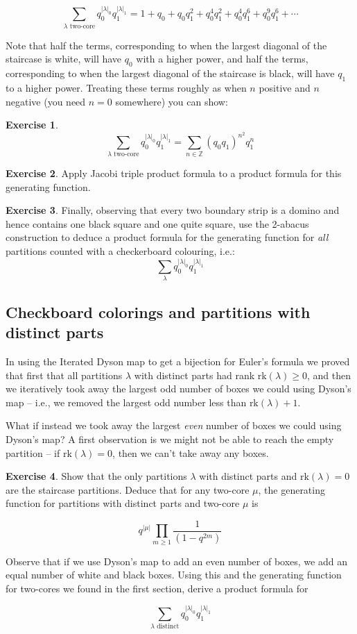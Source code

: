 \documentclass{article}
\theoremstyle{definition}
\newtheorem{exercise}{Exercise}
\begin{document}
$$\sum_{\lambda \textrm{ two-core}}q_0^{|\lambda|_0}q_1^{|\lambda|_1}=1+q_0+q_0q_1^2+q_0^4q_1^2+q_0^4q_1^6+q_0^9q_1^6+\cdots$$

Note that half the terms, corresponding to when the largest diagonal of the staircase is white, will have $q_0$ with a higher power, and half the terms, corresponding to when the largest diagonal of the staircase is black, will have $q_1$ to a higher power. Treating these terms roughly as when $n$ positive and $n$ negative (you need $n=0$ somewhere) you can show:

\begin{exercise}
$$\sum_{\lambda \textrm{ two-core}}q_0^{|\lambda|_0}q_1^{|\lambda|_1}=\sum_{n\in\mathbb{Z}} (q_0q_1)^{n^2}q_1^n$$
\end{exercise}

\begin{exercise}
Apply Jacobi triple product formula to a product formula for this generating function.\end{exercise}

\begin{exercise}
Finally, observing that every two boundary strip is a domino and hence contains one black square and one quite square, use the 2-abacus construction to deduce a product formula for the generating function for \emph{all} partitions counted with a checkerboard colouring, i.e.:
$$\sum_\lambda q_0^{|\lambda|_0}q_1^{|\lambda|_1}$$
\end{exercise}

\subsection{Checkboard colorings and partitions with distinct parts}

In using the Iterated Dyson map to get a bijection for Euler's formula we proved that first that all partitions $\lambda$ with distinct parts had rank $\textrm{rk}(\lambda)\geq 0$, and then we iteratively took away the largest odd number of boxes we could using Dyson's map -- i.e., we removed the largest odd number less than $\textrm{rk}(\lambda)+1$.

What if instead we took away the largest \emph{even} number of boxes we could using Dyson's map?  A first observation is we might not be able to reach the empty partition -- if $\textrm{rk}(\lambda)=0$, then we can't take away any boxes.  

\begin{exercise}
Show that the only partitions $\lambda$ with distinct parts and $\textrm{rk}(\lambda)=0$ are the staircase partitions.  Deduce that for any two-core $\mu$, the generating function for partitions with distinct parts and two-core $\mu$ is

$$q^{|\mu|}\prod_{m\geq 1}\frac{1}{(1-q^{2m})}$$
\end{exercise}


Observe that if we use Dyson's map to add an even number of boxes, we add an equal number of white and black boxes.  Using this and the generating function for two-cores we found in the first section, derive a product formula for

$$\sum_{\lambda \textrm{ distinct}} q_0^{|\lambda|_0}q_1^{|\lambda|_1}$$
\end{document}
